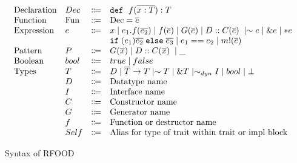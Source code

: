 \documentclass[ oneside,%
                    author={James Elgar},
                    degree={MEng},
                     title={Bidirectional transformer between functional and \\ object-oriented programming in Rust},
                  subtitle={}]{dissertation}
\begin{document}
\begin{figure}[t]
\begin{displaymath}
\begin{array}{l}
\begin{array}{llcl}
         \text{Declaration}
         & Dec & \Coloneqq & \dec {x: T} T\\
         \text{Function}
         & \text{Fun} & \text{$\Coloneqq$} & \text{Dec} = \overline{e} \\
        \text{Expression}
         & e & \Coloneqq & x %
          \mid e_1.f(\overline{e_2})  \mid f(\overline{e}) \mid \genn(\overline{e}) \mid \ctrCall{\dtn}{\ctrn}{e} \mid \sim e\mid \&e \mid *e\\
         &   &           & \ifelseexpr{e_1}{e_2}{e_3} \mid \eqexpr{e_1}{e_2} \mid \macroexpr{m}{e} \\
         \text{Pattern}
         & P & \Coloneqq & \genn(\overline{x}) \mid \ctrCall{\dtn}{\ctrn}{x} \mid \_ \\
        \text{Boolean}
        & bool & \Coloneqq & true \mid false  \\
        \text{Types}
        & T & \Coloneqq & \dtn \mid \overline{T} \rightarrow T \mid \sim  T \mid \& T \mid \sim_{dyn} \itn \mid bool \mid \bot \\
        & \dtn & \Coloneqq & \text{Datatype name} \\
        & \itn & \Coloneqq & \text{Interface name} \\
        & \ctrn & \Coloneqq & \text{Constructor name} \\
        & \genn & \Coloneqq & \text{Generator name} \\
        & f & \Coloneqq & \text{Function or destructor name} \\
        & Self & \Coloneqq & \text{Alias for type of trait within trait or impl block} \\
        
      \end{array}
    \end{array}
  \end{displaymath}
  \caption{Syntax of RFOOD}
  \label{fig:syntax}
\end{figure}
\end{document}
